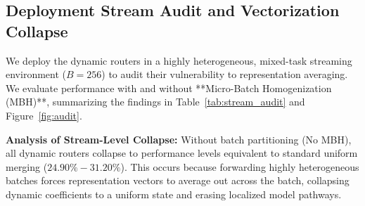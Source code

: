 \subsection{Deployment Stream Audit and Vectorization Collapse}
We deploy the dynamic routers in a highly heterogeneous, mixed-task streaming environment ($B=256$) to audit their vulnerability to representation averaging. We evaluate performance with and without **Micro-Batch Homogenization (MBH)**, summarizing the findings in Table~\ref{tab:stream_audit} and Figure~\ref{fig:audit}.

\begin{table}[h]
\caption{Inference stream heterogeneity audit. We report test joint accuracy (\%) with and without Micro-Batch Homogenization (MBH).}
\label{tab:stream_audit}
\vskip 0.15in
\begin{center}
\begin{small}
\begin{sc}
\end{sc}
\end{small}
\end{center}
\vskip -0.1in
\end{table}

\textbf{Analysis of Stream-Level Collapse:}
Without batch partitioning (No MBH), all dynamic routers collapse to performance levels equivalent to standard uniform merging ($24.90\% - 31.20\%$). This occurs because forwarding highly heterogeneous batches forces representation vectors to average out across the batch, collapsing dynamic coefficients to a uniform state and erasing localized model pathways.

